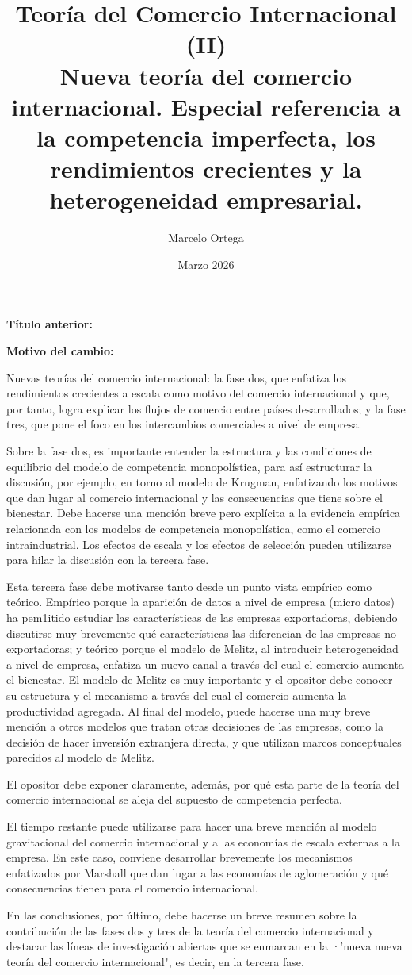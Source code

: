\documentclass[10pt,a4paper]{article}
\title{Teoría del Comercio Internacional (II)\\
\large Nueva teoría del comercio internacional. Especial referencia a la competencia imperfecta, los rendimientos crecientes y la heterogeneidad empresarial.}
\author{Marcelo Ortega}
\date{Marzo 2026}
\newcommand{\puntosclave}[1]{%
  \begin{tcolorbox}[
    colframe=black,
    title={Puntos clave},
    before upper={\setlength{\parindent}{0.5cm}\setlength{\parskip}{0.5\baselineskip}}
  ]
  #1
  \end{tcolorbox}
}
\newcommand{\changebox}{%
\begin{tcolorbox}[title={Historial de cambios del tema}]
\textbf{Título anterior:} \OldTitle\par
\textbf{Motivo del cambio:} \ChangeWhy
\end{tcolorbox}
}
\begin{document}
\maketitle
\changebox

\newpage

\puntosclave{ %
     Nuevas teorías del comercio internacional: la fase dos, que enfatiza los rendimientos crecientes a escala como motivo del comercio internacional y que, por tanto, logra explicar los flujos de comercio entre países desarrollados; y la fase tres, que pone el foco en los intercambios comerciales a nivel de empresa.

     Sobre la fase dos, es importante entender la estructura y las condiciones de equilibrio del modelo de competencia monopolística, para así estructurar la discusión, por ejemplo, en torno al modelo de Krugman, enfatizando los motivos que dan lugar al comercio internacional y las consecuencias que tiene sobre el bienestar. Debe hacerse una mención breve pero explícita a la evidencia empírica relacionada con los modelos de competencia monopolística, como el comercio intraindustrial. Los efectos de escala y los efectos de selección pueden utilizarse para hilar la discusión con la tercera fase.

     Esta tercera fase debe motivarse tanto desde un punto vista empírico como teórico. Empírico porque la aparición de datos a nivel de empresa (micro datos) ha pem1itido estudiar las características de las empresas exportadoras, debiendo discutirse muy brevemente qué características las diferencian de las empresas no exportadoras; y teórico porque el modelo de Melitz, al introducir heterogeneidad a nivel de empresa, enfatiza un nuevo canal a través del cual el comercio aumenta el bienestar. El modelo de Melitz es muy importante y el opositor debe conocer su estructura y el mecanismo a través del cual el comercio aumenta la productividad agregada. Al final del modelo, puede hacerse una muy breve mención a otros modelos que tratan otras decisiones de las empresas, como la decisión de hacer inversión extranjera directa, y que utilizan marcos conceptuales parecidos al modelo de Melitz.
     
     El opositor debe exponer claramente, además, por qué esta parte de la teoría del comercio internacional se aleja del supuesto de competencia perfecta.

     El tiempo restante puede utilizarse para hacer una breve mención al modelo gravitacional del comercio internacional y a las economías de escala externas a la empresa. En este caso, conviene desarrollar brevemente los mecanismos enfatizados por Marshall que dan lugar a las economías de aglomeración y qué consecuencias tienen para el comercio internacional.

     En las conclusiones, por último, debe hacerse un breve resumen sobre la contribución de las fases dos y tres de la teoría del comercio internacional y destacar las líneas de investigación abiertas que se enmarcan en la ·'nueva nueva teoría del comercio internacional", es decir, en la tercera fase.
    }
\vspace{1cm}
\end{document}
